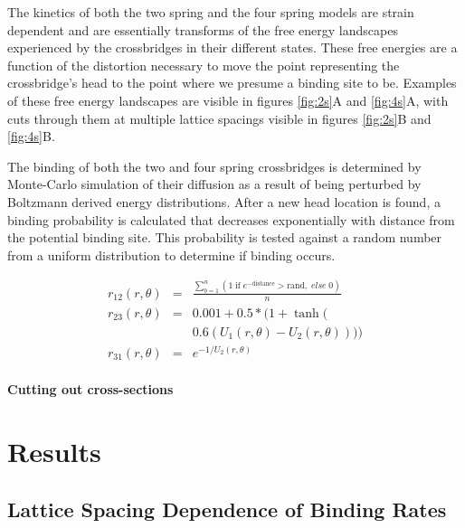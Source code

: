 \documentclass[]{article}
\begin{document}
The kinetics of both the two spring and the four spring models are strain dependent and are essentially transforms of the free energy landscapes experienced by the crossbridges in their different states.
These free energies are a function of the distortion necessary to move the point representing the crossbridge's head to the point where we presume a binding site to be.
Examples of these free energy landscapes are visible in figures \ref{fig:2s}A and \ref{fig:4s}A, with cuts through them at multiple lattice spacings visible in figures \ref{fig:2s}B and \ref{fig:4s}B.

The binding of both the two and four spring crossbridges is determined by Monte-Carlo simulation of their diffusion as a result of being perturbed by Boltzmann derived energy distributions. 
After a new head location is found, a binding probability is calculated that decreases exponentially with distance from the potential binding site. 
This probability is tested against a random number from a uniform distribution to determine if binding occurs.



\begin{eqnarray}  
\label{eq:KineticRates}
	r_{12}(r, \theta)   & = & \frac{\sum_{b=1}^n (1\; \textrm{if}\; e^{-\textrm{distance}}>\textrm{rand} ,\; else\; 0)}{n}  \nonumber \\
    r_{23}(r, \theta)   & = & 0.001 + 0.5 * (1 + \tanh( \nonumber \\
                        &   & 0.6 (U_1(r, \theta) - U_2(r, \theta)))) \\
	r_{31}(r, \theta)   & = & e^{-1 / U_2(r, \theta)}
\end{eqnarray} 


\paragraph*{Cutting out cross-sections}




\section*{Results} %
\label{sec:results}

\subsection*{Lattice Spacing Dependence of Binding Rates}
\end{document}
